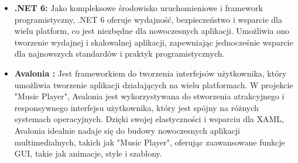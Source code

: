 \begin{itemize}
    \item \textbf{ .NET 6:}  Jako kompleksowe środowisko uruchomieniowe i framework programistyczny, .NET 6 oferuje wydajność, bezpieczeństwo i wsparcie dla wielu platform, co jest niezbędne dla nowoczesnych aplikacji. Umożliwia ono tworzenie wydajnej i skalowalnej aplikacji, zapewniając jednocześnie wsparcie dla najnowszych standardów i praktyk programistycznych.
    \item \textbf{ Avalonia :} Jest frameworkiem do tworzenia interfejsów użytkownika, który umożliwia tworzenie aplikacji działających na wielu platformach. W projekcie "Music Player", Avalonia jest wykorzystywana do stworzenia atrakcyjnego i responsywnego interfejsu użytkownika, który jest spójny na różnych systemach operacyjnych. Dzięki swojej elastyczności i wsparciu dla XAML, Avalonia idealnie nadaje się do budowy nowoczesnych aplikacji multimedialnych, takich jak "Music Player", oferując zaawansowane funkcje GUI, takie jak animacje, style i szablony.
    

\end{itemize}
